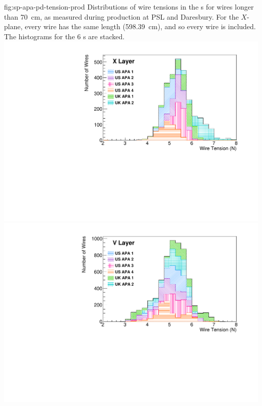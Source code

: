 \begin{dunefigure}{fig:sp-apa-pd-tension-prod}
{Distributions of wire tensions in the  s for wires longer than \SI{70}{cm}, as measured during production at PSL and Daresbury. For the $X$-plane, every wire has the same length (\SI{598.39}{cm}), and so every wire is included.  
The histograms for the 6 s are stacked. 
}
\includegraphics[height=0.28\textheight,trim=0mm 0mm 0mm 0mm,clip]{graphics/sp-apa-X-layer-tensions.pdf}
\includegraphics[height=0.28\textheight,trim=0mm 0mm 0mm 0mm,clip]{graphics/sp-apa-V-layer-tensions.pdf}

\end{dunefigure}
